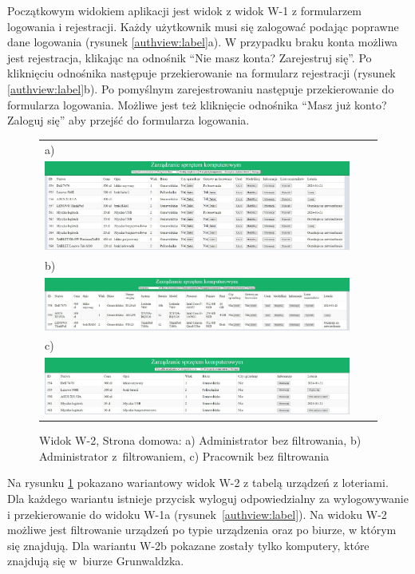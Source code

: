\newpage
Początkowym widokiem aplikacji jest widok z widok W-1 z formularzem logowania i rejestracji. Każdy użytkownik musi się zalogować podając poprawne dane logowania (rysunek \ref{authview:label}a). W przypadku braku konta możliwa jest rejestracja, klikając na odnośnik "`Nie masz konta? Zarejestruj się"'. Po kliknięciu odnośnika następuje przekierowanie na formularz rejestracji (rysunek \ref{authview:label}b). Po pomyślnym zarejestrowaniu następuje przekierowanie do formularza logowania. Możliwe jest też kliknięcie odnośnika "`Masz już konto? Zaloguj się"' aby przejść do formularza logowania.
\begin{figure}[H]
  \centering
	\begin{tabular}{@{}lll@{}}
	a)\\
  \includegraphics[width=\textwidth]{rys05/view/alldevices.pdf} \\
	
	b)\\
	\includegraphics[width=\textwidth]{rys05/view/compGrun.pdf} \\
	c) \\
	\includegraphics[width=\textwidth]{rys05/view/pracownikHome.pdf}
	\end{tabular}
  \caption{Widok W-2, Strona domowa: a) Administrator bez filtrowania, b) Administrator z~filtrowaniem, c) Pracownik bez filtrowania}
  \label{home:label}
\end{figure}

Na rysunku \ref{home:label} pokazano wariantowy widok W-2 z tabelą urządzeń z loteriami. Dla każdego wariantu istnieje przycisk wyloguj odpowiedzialny za wylogowywanie i przekierowanie do widoku W-1a (rysunek~\ref{authview:label}). Na widoku W-2 możliwe jest filtrowanie urządzeń po typie urządzenia oraz po biurze, w którym się znajdują. Dla wariantu W-2b pokazane zostały tylko komputery, które znajdują się w~biurze Grunwaldzka. 

